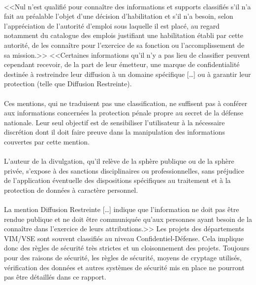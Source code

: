 \documentclass[11pt, book, english, french, standardlists]{upmethodology-document}
\begin{document}
				\paragraph*{}
					<<Nul n'est qualifié pour connaître des informations et supports classifiés s'il n'a fait au préalable l'objet d'une décision d'habilitation et s'il n'a besoin, selon l'appréciation de l'autorité d'emploi sous laquelle il est placé, au regard notamment du catalogue des emplois justifiant une habilitation établi par cette autorité, de les connaître pour l'exercice de sa fonction ou l'accomplissement de sa mission.>>\cite{CodeDefenseR2311-7}
					<<Certaines informations qu'il n'y a pas lieu de classifier peuvent cependant recevoir, de la part de leur émetteur, une marque de confidentialité destinée à restreindre leur diffusion à un domaine spécifique [\ldots] ou à garantir leur protection (telle que Diffusion Restreinte).
				\paragraph*{}
					Ces mentions, qui ne traduisent pas une classification, ne suffisent pas à conférer aux informations concernées la protection pénale propre au secret de la défense nationale. Leur seul objectif est de sensibiliser l'utilisateur à la nécessaire discrétion dont il doit faire preuve dans la manipulation des informations couvertes par cette mention.
				\paragraph*{}
					L'auteur de la divulgation, qu'il relève de la sphère publique ou de la sphère privée, s'expose à des sanctions disciplinaires ou professionnelles, sans préjudice de l'application éventuelle des dispositions spécifiques au traitement et à la protection de données à caractère personnel.
				\paragraph*{}
					La mention Diffusion Restreinte [\ldots] indique que l'information ne doit pas être rendue publique et ne doit être communiquée qu'aux personnes ayant besoin de la connaître dans l'exercice de leurs attributions.>>\cite{PRMD1132480A}
					Les projets des départements \gls{VIM/VSE} sont souvent classifiés au niveau Confidentiel-Défense. Cela implique donc des règles de sécurité très strictes et un cloisonnement des projets. Toujours pour des raisons de sécurité, les règles de sécurité, moyens de cryptage utilisés, vérification des données et autres systèmes de sécurité mis en place ne pourront pas être détaillés dans ce rapport.
\end{document}
